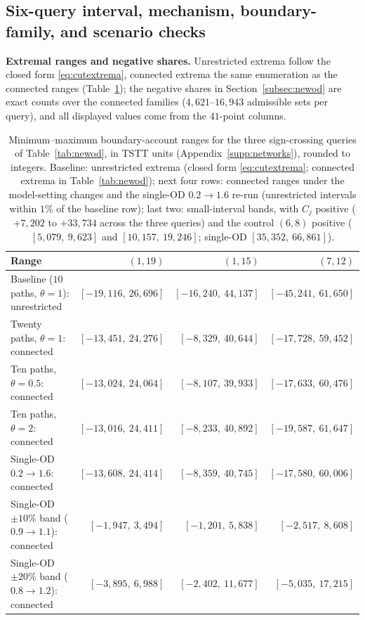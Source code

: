\subsection{Six-query interval, mechanism, boundary-family, and
scenario checks}\label{supp:newodaccuracy}


\textbf{Extremal ranges and negative shares.}
Unrestricted extrema follow the closed form \eqref{eq:cutextrema},
connected extrema the same enumeration as the connected ranges
(Table~\ref{tab:newodinterval}); the negative shares in
Section~\ref{subsec:newod} are exact counts over the connected
families ($4{,}621$--$16{,}943$ admissible sets per query), and all
displayed values come from the $41$-point columns.

\begin{table}[pos=tbh]
\footnotesize
\caption{Minimum--maximum boundary-account ranges for the three
sign-crossing queries of Table~\ref{tab:newod}, in TSTT units
(Appendix~\ref{supp:networks}), rounded to integers. Baseline:
unrestricted extrema (closed form \eqref{eq:cutextrema}; connected
extrema in Table~\ref{tab:newod}); next four rows: connected
ranges under the model-setting changes and the single-OD
$0.2\to1.6$ re-run (unrestricted intervals within $1\%$ of the
baseline row); last two: small-interval bands, with $C_j$ positive
($+7{,}202$ to $+33{,}734$ across the three queries) and the control
$(6,8)$ positive ($[5{,}079,\ 9{,}623]$ and $[10{,}157,\ 19{,}246]$;
single-OD $[35{,}352,\ 66{,}861]$).}
\label{tab:newodinterval}
\footnotesize
\begin{tabular*}{\tblwidth}{@{\extracolsep{\fill}}lrrr}
\toprule
Range & $(1,19)$ & $(1,15)$ & $(7,12)$\\
\midrule
Baseline ($10$ paths, $\theta=1$): unrestricted & $[-19{,}116,\ 26{,}696]$ & $[-16{,}240,\ 44{,}137]$ & $[-45{,}241,\ 61{,}650]$\\
\addlinespace
Twenty paths, $\theta=1$: connected & $[-13{,}451,\ 24{,}276]$ & $[-8{,}329,\ 40{,}644]$ & $[-17{,}728,\ 59{,}452]$\\
Ten paths, $\theta=0.5$: connected & $[-13{,}024,\ 24{,}064]$ & $[-8{,}107,\ 39{,}933]$ & $[-17{,}633,\ 60{,}476]$\\
Ten paths, $\theta=2$: connected & $[-13{,}016,\ 24{,}411]$ & $[-8{,}233,\ 40{,}892]$ & $[-19{,}587,\ 61{,}647]$\\
Single-OD $0.2\to1.6$: connected & $[-13{,}608,\ 24{,}414]$ & $[-8{,}359,\ 40{,}745]$ & $[-17{,}580,\ 60{,}006]$\\
Single-OD $\pm10\%$ band ($0.9\to1.1$): connected & $[-1{,}947,\ 3{,}494]$ & $[-1{,}201,\ 5{,}838]$ & $[-2{,}517,\ 8{,}608]$\\
Single-OD $\pm20\%$ band ($0.8\to1.2$): connected & $[-3{,}895,\ 6{,}988]$ & $[-2{,}402,\ 11{,}677]$ & $[-5{,}035,\ 17{,}215]$\\
\bottomrule
\end{tabular*}
\end{table}

